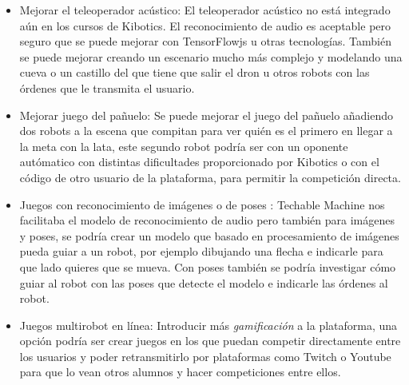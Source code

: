 \begin{itemize}
\item Mejorar el teleoperador acústico: El teleoperador acústico no está integrado aún en los cursos de  Kibotics. El reconocimiento de audio es aceptable pero seguro que se puede mejorar con TensorFlowjs u otras tecnologías. También se puede mejorar creando un escenario mucho más complejo y modelando una cueva o un castillo del que tiene que salir el dron u otros robots con las órdenes que le transmita el usuario.

\item Mejorar juego del pañuelo: Se puede mejorar el juego del pañuelo añadiendo dos robots a la escena que compitan para ver quién es el primero en llegar a la meta con la lata, este segundo robot podría ser con un oponente autómatico con distintas dificultades proporcionado por Kibotics o con el código de otro usuario de la plataforma, para permitir la competición directa.

\item  Juegos con reconocimiento de imágenes o de poses : Techable Machine nos facilitaba el modelo de reconocimiento de audio pero también para imágenes y poses, se podría crear un modelo que basado en procesamiento de imágenes pueda guiar a un robot, por ejemplo dibujando una flecha e indicarle para que lado quieres que se mueva. Con poses también se podría investigar cómo guiar al robot con las poses que detecte el modelo e indicarle las órdenes al robot.

\item Juegos multirobot en línea: Introducir más \textit{gamificación} a la plataforma, una opción podría ser crear juegos en los que puedan competir directamente entre los usuarios y poder retransmitirlo por plataformas como Twitch o Youtube para que lo vean otros alumnos y hacer competiciones entre ellos.


\end{itemize}
